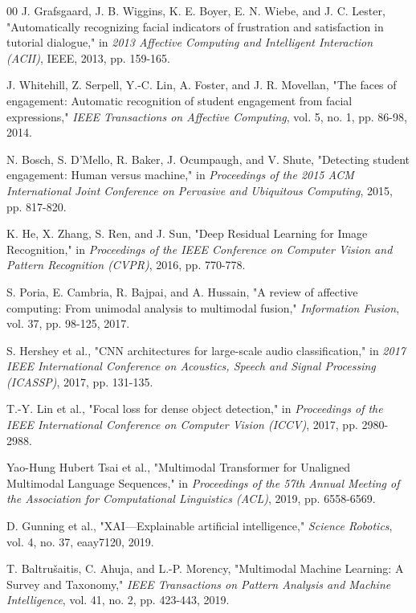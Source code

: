 \documentclass[conference]{IEEEtran}
\begin{document}
\begin{thebibliography}{00}
 J. Grafsgaard, J. B. Wiggins, K. E. Boyer, E. N. Wiebe, and J. C. Lester, "Automatically recognizing facial indicators of frustration and satisfaction in tutorial dialogue," in \textit{2013 Affective Computing and Intelligent Interaction (ACII)}, IEEE, 2013, pp. 159-165.

 J. Whitehill, Z. Serpell, Y.-C. Lin, A. Foster, and J. R. Movellan, "The faces of engagement: Automatic recognition of student engagement from facial expressions," \textit{IEEE Transactions on Affective Computing}, vol. 5, no. 1, pp. 86-98, 2014.

 N. Bosch, S. D'Mello, R. Baker, J. Ocumpaugh, and V. Shute, "Detecting student engagement: Human versus machine," in \textit{Proceedings of the 2015 ACM International Joint Conference on Pervasive and Ubiquitous Computing}, 2015, pp. 817-820.

 K. He, X. Zhang, S. Ren, and J. Sun, "Deep Residual Learning for Image Recognition," in \textit{Proceedings of the IEEE Conference on Computer Vision and Pattern Recognition (CVPR)}, 2016, pp. 770-778.

 S. Poria, E. Cambria, R. Bajpai, and A. Hussain, "A review of affective computing: From unimodal analysis to multimodal fusion," \textit{Information Fusion}, vol. 37, pp. 98-125, 2017.

 S. Hershey et al., "CNN architectures for large-scale audio classification," in \textit{2017 IEEE International Conference on Acoustics, Speech and Signal Processing (ICASSP)}, 2017, pp. 131-135.

 T.-Y. Lin et al., "Focal loss for dense object detection," in \textit{Proceedings of the IEEE International Conference on Computer Vision (ICCV)}, 2017, pp. 2980-2988.

 Yao-Hung Hubert Tsai et al., "Multimodal Transformer for Unaligned Multimodal Language Sequences," in \textit{Proceedings of the 57th Annual Meeting of the Association for Computational Linguistics (ACL)}, 2019, pp. 6558-6569.

 D. Gunning et al., "XAI—Explainable artificial intelligence," \textit{Science Robotics}, vol. 4, no. 37, eaay7120, 2019.

 T. Baltrušaitis, C. Ahuja, and L.-P. Morency, "Multimodal Machine Learning: A Survey and Taxonomy," \textit{IEEE Transactions on Pattern Analysis and Machine Intelligence}, vol. 41, no. 2, pp. 423-443, 2019.


\end{thebibliography}
\end{document}
